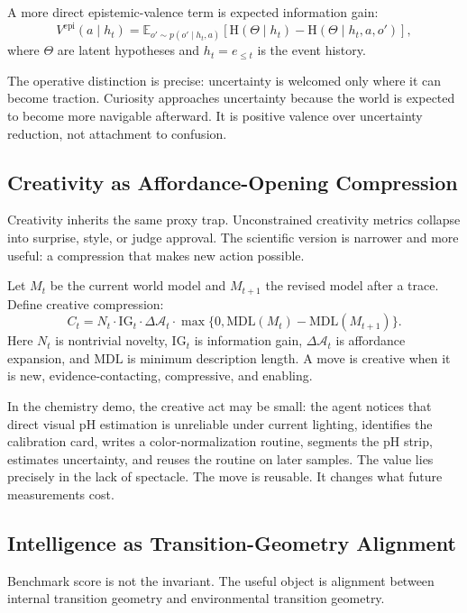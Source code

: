 \documentclass[11pt]{article}
\newcommand{\A}{\mathcal{A}}
\newcommand{\IG}{\mathrm{IG}}
\newcommand{\Ent}{\mathrm{H}}
\newcommand{\MDL}{\mathrm{MDL}}
\begin{document}
A more direct epistemic-valence term is expected information gain:
\begin{equation}
  V^{\mathrm{epi}}(a\mid h_t)=\mathbb{E}_{o'\sim p(o'\mid h_t,a)}\left[\Ent(\Theta\mid h_t)-\Ent(\Theta\mid h_t,a,o')\right],
\end{equation}
where $\Theta$ are latent hypotheses and $h_t=e_{\le t}$ is the event history.

The operative distinction is precise: uncertainty is welcomed only where it can become traction. Curiosity approaches uncertainty because the world is expected to become more navigable afterward. It is positive valence over uncertainty reduction, not attachment to confusion.

\subsection{Creativity as Affordance-Opening Compression}

Creativity inherits the same proxy trap. Unconstrained creativity metrics collapse into surprise, style, or judge approval. The scientific version is narrower and more useful: a compression that makes new action possible.

Let $M_t$ be the current world model and $M_{t+1}$ the revised model after a trace. Define creative compression:
\begin{equation}
  C_t = N_t \cdot \IG_t \cdot \Delta \A_t \cdot \max\{0,\MDL(M_t)-\MDL(M_{t+1})\}.
\end{equation}
Here $N_t$ is nontrivial novelty, $\IG_t$ is information gain, $\Delta\A_t$ is affordance expansion, and $\MDL$ is minimum description length. A move is creative when it is new, evidence-contacting, compressive, and enabling.

In the chemistry demo, the creative act may be small: the agent notices that direct visual pH estimation is unreliable under current lighting, identifies the calibration card, writes a color-normalization routine, segments the pH strip, estimates uncertainty, and reuses the routine on later samples. The value lies precisely in the lack of spectacle. The move is reusable. It changes what future measurements cost.

\subsection{Intelligence as Transition-Geometry Alignment}

Benchmark score is not the invariant. The useful object is alignment between internal transition geometry and environmental transition geometry.
\end{document}
